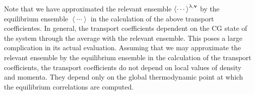 \documentclass[b5paper,openright,10pt]{book}
\newcommand{\llangle}{\left\langle}
\newcommand{\rrangle}{\right\rangle}
\begin{document}
Note that we have approximated the relevant ensemble $\llangle\cdots\rrangle^{\lambda,{\bf v}}$ by the equilibrium ensemble $\llangle\cdots\rrangle$ in the calculation of the above transport coefficientes. 
In  general, the transport coefficients
dependent on the CG state of  the system through the average with the
relevant  ensemble.   This
poses a large  complication in its actual evaluation. Assuming that  we may approximate the relevant ensemble
by the equilibrium ensemble
in  the   calculation   of  the   transport
coefficients, the
transport coefficients  do not depend  on local values of  density and
momenta.  They depend only on  the global thermodynamic point at which
the equilibrium correlations are computed.


\end{document}
